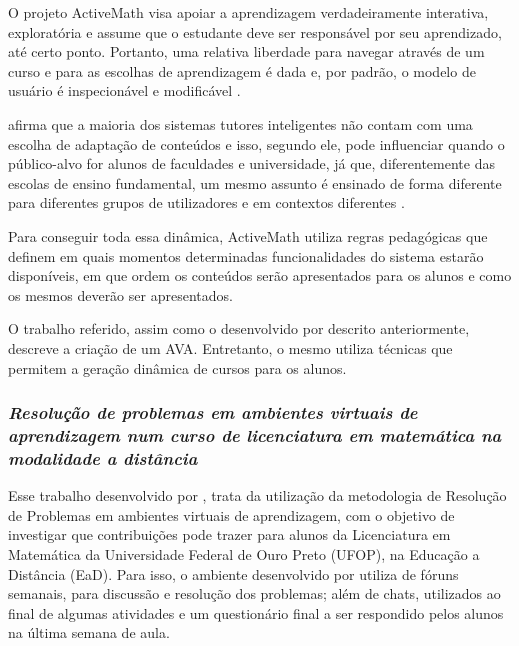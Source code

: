 O projeto ActiveMath visa apoiar a aprendizagem verdadeiramente interativa, exploratória e assume que o estudante deve ser responsável por seu aprendizado, até certo ponto. Portanto, uma relativa liberdade para navegar através de um curso e para as escolhas de aprendizagem é dada e, por padrão, o modelo de usuário é inspecionável e modificável \cite{melis2001activemath}.

 afirma que a maioria dos sistemas tutores inteligentes não contam com uma escolha de adaptação de conteúdos e isso, segundo ele, pode influenciar quando o público-alvo for alunos de faculdades e universidade, já que, diferentemente das escolas de ensino fundamental,  um mesmo assunto é
ensinado de forma diferente para diferentes grupos de utilizadores e em contextos diferentes \cite{melis2001activemath}.

Para conseguir toda essa dinâmica, ActiveMath utiliza regras pedagógicas que definem em quais momentos determinadas funcionalidades do sistema estarão disponíveis, em que ordem os conteúdos serão apresentados para os alunos e como os mesmos deverão ser apresentados.

O trabalho referido,  assim como o desenvolvido por  descrito anteriormente, descreve a criação de um AVA. Entretanto, o mesmo utiliza técnicas que permitem a geração dinâmica 
de cursos para os alunos.


\subsubsection{\textit{Resolução de problemas em ambientes virtuais de aprendizagem num curso de licenciatura em matemática na modalidade a distância}}

Esse trabalho desenvolvido por , trata da   utilização da metodologia de Resolução de Problemas em ambientes virtuais de  aprendizagem, com o objetivo de investigar que contribuições pode trazer para 
alunos da Licenciatura em Matemática da Universidade Federal de Ouro Preto (UFOP), na Educação a Distância (EaD). Para isso, o ambiente desenvolvido por  utiliza de fóruns semanais, para discussão e resolução dos problemas; além de chats, utilizados ao final de algumas atividades e um questionário final a ser respondido pelos alunos na última semana de aula.

